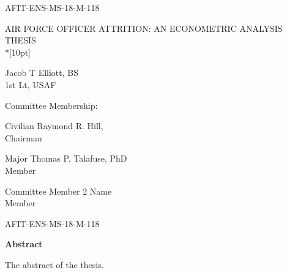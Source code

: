 \documentclass[12pt,letterpaper,toc=flat,oneside]{report}
\theoremstyle{definition}
\theoremstyle{definition}
\theoremstyle{definition}
\theoremstyle{remark}
\begin{document}
	\thispagestyle{empty}
	\setcounter{page}{3}
	\noindent AFIT-ENS-MS-18-M-118
	\vfill
	\begin{center}
	    \MakeUppercase{Air Force Officer Attrition: An Econometric Analysis}\\[10pt]
	    \MakeUppercase{Thesis}\\*[10pt]
	    
	    \begingroup
  \singlespace
    Jacob T Elliott, BS\\ 
    1st Lt, \MakeUppercase{USAF}
    \par
  \endgroup
  
	\bigskip\medskip
	Committee Membership:
	\bigskip\medskip
	
	\begingroup
  \singlespace
    Civilian Raymond R. Hill, \\ 
    Chairman
    \par
  \endgroup
  \bigskip\bigskip
  
  \begingroup
  \singlespace
    Major Thomas P. Talafuse, PhD\\ 
    Member
    \par
  \endgroup
  \bigskip\bigskip
  
  \begingroup
  \singlespace
    Committee Member 2 Name\\ 
    Member
    \par
  \endgroup
  \bigskip\bigskip
  
    
    
  	\end{center}
	\vfill
	\newpage
	\setcounter{page}{4}
	\renewcommand{\thepage}{\roman{page}}
    \thispagestyle{plain}
    \noindent AFIT-ENS-MS-18-M-118
    \begin{center}
	\Large\bfseries Abstract
    \end{center}
    \vspace{2em}
    The abstract of the thesis.
    \newpage
\end{document}
